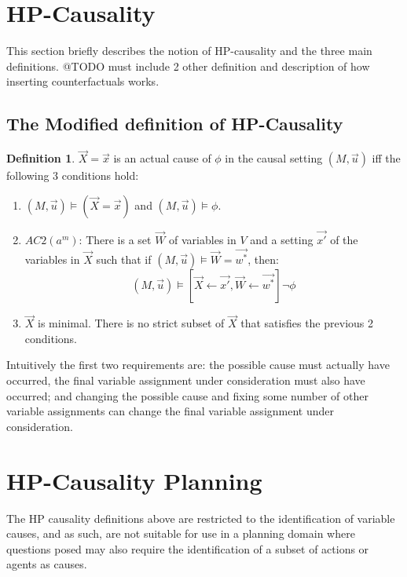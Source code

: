 \documentclass{article}
\theoremstyle{plain}
\theoremstyle{definition}
\newtheorem{defn}[thm]{Definition} %
\begin{document}
\section{HP-Causality}
This section briefly describes the notion of HP-causality and the three main definitions. @TODO must include 2 other definition and description of how inserting counterfactuals works.

\subsection{The Modified definition of HP-Causality}
\begin{defn}$\vec{X}=\vec{x}$ is an actual cause of $\phi$ in the causal setting $(M,\vec{u})$ iff the following 3 conditions hold:
\begin{enumerate}
\item $(M,\vec{u}) \models (\vec{X}=\vec{x})$ and $(M,\vec{u}) \models \phi$.
\item $AC2(a^m)$: There is a set $\vec{W}$ of variables in $V$ and a setting $\vec{x'}$ of the variables in $\vec{X}$ such that if $(M,\vec{u}) \models \vec{W} = \vec{w^*}$, then:
\[
(M,\vec{u}) \models [\vec{X} \leftarrow \vec{x'}, \vec{W} \leftarrow \vec{w^*}] \neg \phi
\]
\item $\vec{X}$ is minimal. There is no strict subset of $\vec{X}$ that satisfies the previous 2 conditions.
\end{enumerate}

\end{defn}

Intuitively the first two requirements are: the possible cause must actually have occurred, the final variable assignment under consideration must also have occurred; and changing the possible cause and fixing some number of other variable assignments can change the final variable assignment under consideration.




\newpage

\section{HP-Causality Planning}
The HP causality definitions above are restricted to the identification of variable causes, and as such, are not suitable for use in a planning domain where questions posed may also require the identification of a subset of actions or agents as causes.
\end{document}
